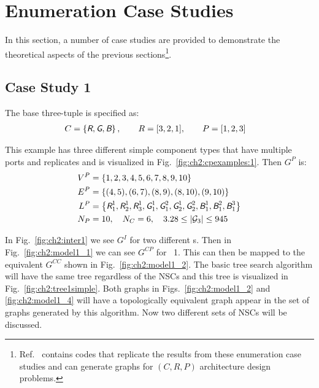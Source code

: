\section{Enumeration Case Studies\label{sec:ch2:simple}}

In this section, a number of case studies are provided to demonstrate the theoretical aspects of the previous sections\footnote{Ref.~\cite{github-pm-architectures-project} contains  codes that replicate the results from these enumeration case studies and can generate graphs for $(C,R,P)$ architecture design problems.}.

\subsection{Case Study 1\label{sec:ch2:example1}}







The base three-tuple is specified as:
\begin{align*}
{C} &= \left\lbrace \xcolor{R}, \xcolor{G}, \xcolor{B} \right\rbrace, \qquad {R} = [ 3, 2, 1 ], \qquad {P} = [ 1, 2, 3 ]
\end{align*}

\noindent This example has three different simple component types that have multiple ports and replicates and is visualized in Fig.~\ref{fig:ch2:cpexamples:1}. Then $G^{P}$ is:
\begin{align*}
{V}^{P} &= \left\lbrace  1, 2, 3, 4, 5, 6, 7, 8, 9, 10 \right\rbrace \\
{E}^{P} &= \left\lbrace  (4,5), (6,7), (8,9), (8,10), (9,10) \right\rbrace \\
{L}^{P} &= \left\lbrace \xcolor{R}_1^1, \xcolor{R}_2^1, \xcolor{R}_3^1, \xcolor{G}_1^1, \xcolor{G}_1^2, \xcolor{G}_2^1, \xcolor{G}_2^2, \xcolor{B}_1^1, \xcolor{B}_1^2, \xcolor{B}_1^3 \right\rbrace \\
N_P &= 10, \quad N_C = 6, \quad 3.28 \leq \abs*{\mathcal{G}_3} \leq 945
\end{align*}

\noindent In Fig.~\ref{fig:ch2:inter1} we see $G^{I}$ for two different \mypm{}s. Then in Fig.~\ref{fig:ch2:model1_1} we can see $G^{CP}$ for \mypm{}~1. This can then be mapped to the equivalent $G^{CC}$ shown in Fig.~\ref{fig:ch2:model1_2}. The basic tree search algorithm will have the same tree regardless of the NSCs and this tree is visualized in Fig.~\ref{fig:ch2:tree1simple}. Both graphs in Figs.~\ref{fig:ch2:model1_2} and \ref{fig:ch2:model1_4} will have a topologically equivalent graph appear in the set of graphs generated by this algorithm. Now two different sets of NSCs will be discussed.


